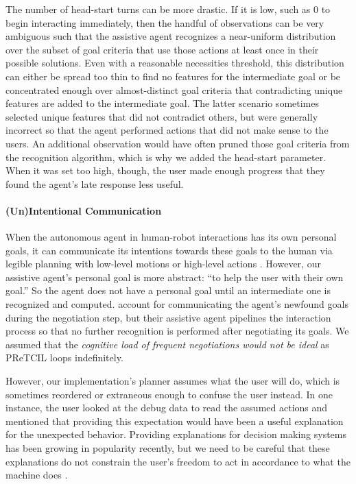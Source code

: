 \documentclass[letterpaper]{article} %
\begin{document}
The number of head-start turns can be more drastic.  If it is low, such as $0$ to begin interacting immediately, then the handful of observations can be very ambiguous such that the assistive agent recognizes a near-uniform distribution over the subset of goal criteria that use those actions at least once in their possible solutions.  Even with a reasonable necessities threshold, this distribution can either be spread too thin to find no features for the intermediate goal or be concentrated enough over almost-distinct goal criteria that contradicting unique features are added to the intermediate goal.  The latter scenario sometimes selected unique features that did not contradict others, but were generally incorrect so that the agent performed actions that did not make sense to the users.  An additional observation would have often pruned those goal criteria from the recognition algorithm, which is why we added the head-start parameter.  When it was set too high, though, the user made enough progress that they found the agent's late response less useful. %



\paragraph{(Un)Intentional Communication} When the autonomous agent in human-robot interactions has its own personal goals, it can communicate its intentions towards these goals to the human via legible planning with low-level motions \cite{Dragan-2013-7732} or high-level actions \cite{DBLP:conf/aaai/KulkarniSK19}.  However, our assistive agent's personal goal is more abstract: ``to help the user with their own goal.''  So the agent does not have a personal goal until an intermediate one is recognized and computed.  \citeauthor{geibPetrick_2016}  account for communicating the agent's newfound goals during the negotiation step, but their assistive agent pipelines the interaction process so that no further recognition is performed after negotiating its goals. %
We assumed that the \textit{cognitive load of frequent negotiations would not be ideal} as {\sc PReTCIL} loops indefinitely.

However, our implementation's planner assumes what the user will do, which is sometimes reordered or extraneous enough to confuse the user instead.  In one instance, the user looked at the debug data to read the assumed actions and mentioned that providing this expectation would have been a useful explanation for the unexpected behavior.  Providing explanations for decision making systems \cite{xaip} has been growing in popularity recently, but we need to be careful that these explanations do not constrain the user's freedom to act in accordance to what the machine does \cite{DBLP:conf/aaaifs/CastroRMB17}.
\end{document}
